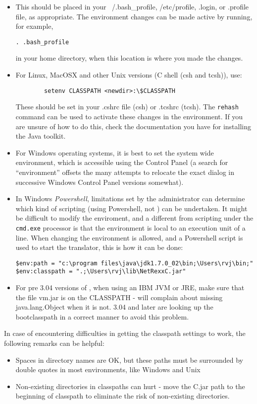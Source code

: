 \begin{itemize}
\item This should be placed
  in your ~/.bash\_profile, /etc/profile, .login, or .profile file, as
  appropriate. The environment changes can be made active by running,
  for example,
\begin{verbatim}
. .bash_profile
\end{verbatim}
in your home directory, when this location is where you made the changes.
\item For Linux, MacOSX and other Unix versions (C shell (csh and tcsh)), use:
\begin{verbatim}
        setenv CLASSPATH <newdir>:\$CLASSPATH 
\end{verbatim}
These should be set in your .cshrc file (csh) or .tcshrc (tcsh). The
\texttt{rehash} command can be used to activate these changes in the environment. If you are unsure of how to do this, check the
documentation you have for installing the Java toolkit.
\item For Windows operating systems, it is best to set the system wide
  environment, which is accessible using the Control Panel (a search
  for ``environment'' offsets the many attempts to relocate the exact
  dialog in successive Windows Control Panel versions somewhat).
\item In Windows \emph{Powershell}, limitations set by the
  administrator can determine which kind of scripting (using
  Powershell, not \nr) can be undertaken. It might be difficult to
  modify the enviroment, and a different from scripting under the
  \texttt{cmd.exe} processor is that the environment is local to an
  execution unit of a line. When changing the environment is allowed,
  and a Powershell script is used to start the \nr translator, this is
  how it can be done:
\begin{verbatim}
$env:path = "c:\program files\java\jdk1.7.0_02\bin;\Users\rvj\bin;"
$env:classpath = ".;\Users\rvj\lib\NetRexxC.jar"
\end{verbatim}
 \item For pre 3.04 versions of \nr{}, when using an IBM JVM or JRE, make sure that the file vm.jar is
   on the CLASSPATH - \nr{} will complain about missing
   java.lang.Object when it is not. \nr{} 3.04 and later are looking
   up the bootclasspath in a correct manner to avoid this problem.
\end{itemize}

In case of encountering difficulties in getting the classpath settings
to work, the following remarks can be helpful:
\begin{itemize}
\item Spaces in directory names are OK, but these paths must be
  surrounded by double quotes in most environments, like Windows and
  Unix
\item Non-existing directories in classpaths can hurt - move the
  \nr{}C.jar path to the beginning of classpath to eliminate the
  risk of non-existing directories.
\end{itemize}

